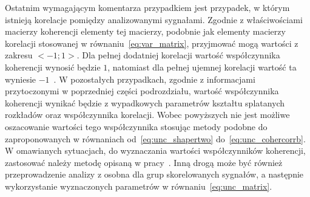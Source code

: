 Ostatnim wymagającym komentarza przypadkiem jest przypadek, w którym istnieją korelacje pomiędzy analizowanymi sygnałami. Zgodnie z właściwościami macierzy koherencji elementy tej macierzy, podobnie jak elementy macierzy korelacji stosowanej w równaniu~\eqref{eq:var_matrix}, przyjmować mogą wartości z zakresu $<-1;1>$. Dla pełnej dodatniej korelacji wartość współczynnika koherencji wynosić będzie $1$, natomiast dla pełnej ujemnej korelacji wartość ta wyniesie $-1$~\cite{jakubiec_redmono}. W pozostałych przypadkach, zgodnie z informacjami przytoczonymi w poprzedniej części podrozdziału, wartość współczynnika koherencji wynikać będzie z wypadkowych parametrów kształtu splatanych rozkładów oraz współczynnika korelacji. Wobec powyższych nie jest możliwe oszacowanie wartości tego współczynnika stosując metody podobne do zaproponowanych w równaniach od~\eqref{eq:unc_shapertwo} do~\eqref{eq:unc_cohercorrb}. W omawianych sytuacjach, do wyznaczania wartości współczynników koherencji, zastosować należy metodę opisaną w pracy~\cite{jakubiec_reductive}. Inną drogą może być również przeprowadzenie analizy z osobna dla grup skorelowanych sygnałów, a następnie wykorzystanie wyznaczonych parametrów w równaniu~\eqref{eq:unc_matrix}.

